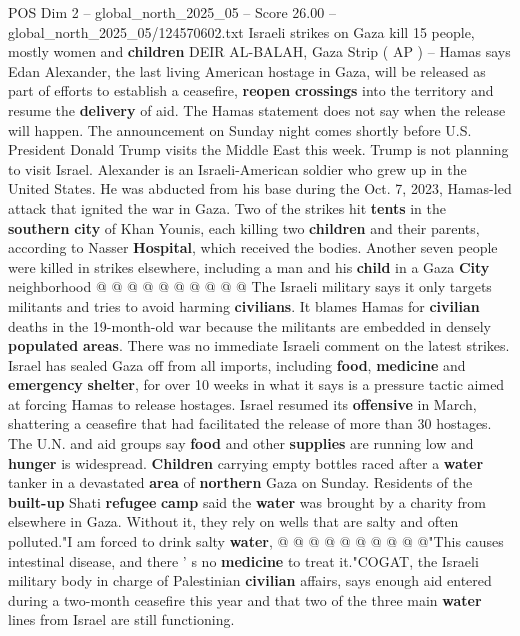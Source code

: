 \begin{textsample}{POS Dim 2 – global\_north\_2025\_05 – Score 26.00 – global\_north\_2025\_05/124570602.txt}  \label{ex:f2_pos_220}
Israeli strikes on Gaza kill 15 people, mostly women and \textbf{children} DEIR AL-BALAH, Gaza Strip ( AP ) -- Hamas says Edan Alexander, the last living American hostage in Gaza, will be released as part of efforts to establish a ceasefire, \textbf{reopen} \textbf{crossings} into the territory and resume the \textbf{delivery} of aid.
The Hamas statement does not say when the release will happen.
The announcement on Sunday night comes shortly before U.S.
President Donald Trump visits the Middle East this week.
Trump is not planning to visit Israel.
Alexander is an Israeli-American soldier who grew up in the United States.
He was abducted from his base during the Oct. 7, 2023, Hamas-led attack that ignited the war in Gaza.
Two of the strikes hit \textbf{tents} in the \textbf{southern} \textbf{city} of Khan Younis, each killing two \textbf{children} and their parents, according to Nasser \textbf{Hospital}, which received the bodies.
Another seven people were killed in strikes elsewhere, including a man and his \textbf{child} in a Gaza \textbf{City} neighborhood @ @ @ @ @ @ @ @ @ @ The Israeli military says it only targets militants and tries to avoid harming \textbf{civilians}.
It blames Hamas for \textbf{civilian} deaths in the 19-month-old war because the militants are embedded in densely \textbf{populated} \textbf{areas}.
There was no immediate Israeli comment on the latest strikes.
Israel has sealed Gaza off from all imports, including \textbf{food}, \textbf{medicine} and \textbf{emergency} \textbf{shelter}, for over 10 weeks in what it says is a pressure tactic aimed at forcing Hamas to release hostages.
Israel resumed its \textbf{offensive} in March, shattering a ceasefire that had facilitated the release of more than 30 hostages.
The U.N. and aid groups say \textbf{food} and other \textbf{supplies} are running low and \textbf{hunger} is widespread. \textbf{Children} carrying empty bottles raced after a \textbf{water} tanker in a devastated \textbf{area} of \textbf{northern} Gaza on Sunday.
Residents of the \textbf{built-up} Shati \textbf{refugee} \textbf{camp} said the \textbf{water} was brought by a charity from elsewhere in Gaza.
Without it, they rely on wells that are salty and often polluted."I am forced to drink salty \textbf{water}, @ @ @ @ @ @ @ @ @ @"This causes intestinal disease, and there ' s no \textbf{medicine} to treat it."COGAT, the Israeli military body in charge of Palestinian \textbf{civilian} affairs, says enough aid entered during a two-month ceasefire this year and that two of the three main \textbf{water} lines from Israel are still functioning.

\end{textsample}
